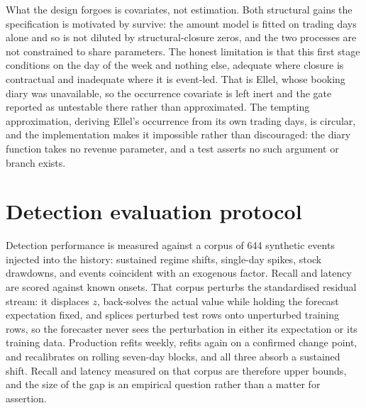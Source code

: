 What the design forgoes is covariates, not estimation. Both structural gains the specification is
motivated by survive: the amount model is fitted on trading days alone and so is not diluted by
structural-closure zeros, and the two processes are not constrained to share parameters. The
honest limitation is that this first stage conditions on the day of the week and nothing else,
adequate where closure is contractual and inadequate where it is event-led. That is Ellel, whose
booking diary was unavailable, so the occurrence covariate is left inert and the gate reported as
untestable there rather than approximated. The tempting approximation, deriving Ellel's occurrence
from its own trading days, is circular, and the implementation makes it impossible rather than
discouraged: the diary function takes no revenue parameter, and a test asserts no such argument or
branch exists.

\section{Detection evaluation protocol}
\label{sec:injection}

Detection performance is measured against a corpus of 644 synthetic events injected into the
history: sustained regime shifts, single-day spikes, stock drawdowns, and events coincident with
an exogenous factor. Recall and latency are scored against known onsets.
That corpus perturbs the standardised residual stream: it displaces $z$, back-solves the actual
value while holding the forecast expectation fixed, and splices perturbed test rows onto
unperturbed training rows, so the forecaster never sees the perturbation in either its expectation
or its training data. Production refits weekly, refits again on a confirmed change point, and
recalibrates on rolling seven-day blocks, and all three absorb a sustained shift. Recall and
latency measured on that corpus are therefore upper bounds, and the size of the gap is an
empirical question rather than a matter for assertion.

